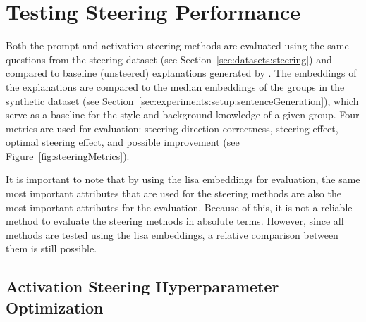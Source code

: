 \begin{table}[ht]
\begin{subtable}[t]{0.49\linewidth}
  \end{subtable}
  \hfill
  \begin{subtable}[t]{0.49\linewidth}
    \label{table:embedder:mediansForeignDomain}
    \resultEmbedderToMediansForeignDomain{}
  \end{subtable}
\end{table}

\section{Testing Steering Performance}%
\label{sec:evaluation:steering}

Both the prompt and activation steering methods are evaluated using the same questions from the steering dataset (see Section~\ref{sec:datasets:steering}) and compared to baseline (unsteered) explanations generated by . The embeddings of the explanations are compared to the median embeddings of the groups in the synthetic dataset (see Section~\ref{sec:experiments:setup:sentenceGeneration}), which serve as a baseline for the style and background knowledge of a given group. Four metrics are used for evaluation: steering direction correctness, steering effect, optimal steering effect, and possible improvement (see Figure~\ref{fig:steeringMetrics}).

It is important to note that by using the \ac{lisa} embeddings for evaluation, the same most important attributes that are used for the steering methods are also the most important attributes for the evaluation. Because of this, it is not a reliable method to evaluate the steering methods in absolute terms. However, since all methods are tested using the \ac{lisa} embeddings, a relative comparison between them is still possible.

\subsection{Activation Steering Hyperparameter Optimization}%
\label{sec:evaluation:steering:activationHPO}

